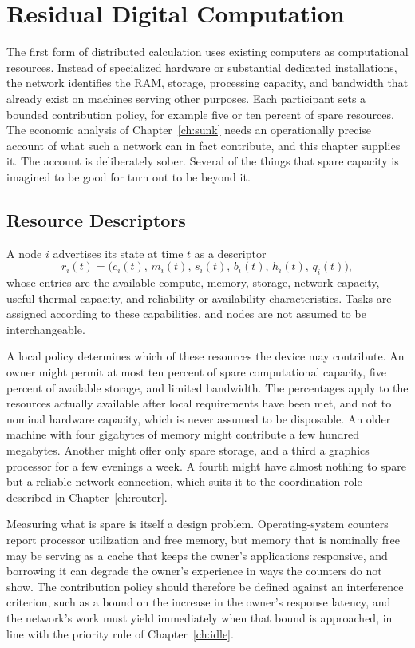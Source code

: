 \chapter{Residual Digital Computation}
\label{ch:residual}

The first form of distributed calculation uses existing computers as computational resources. Instead of specialized hardware or substantial dedicated installations, the network identifies the RAM, storage, processing capacity, and bandwidth that already exist on machines serving other purposes. Each participant sets a bounded contribution policy, for example five or ten percent of spare resources. The economic analysis of Chapter~\ref{ch:sunk} needs an operationally precise account of what such a network can in fact contribute, and this chapter supplies it. The account is deliberately sober. Several of the things that spare capacity is imagined to be good for turn out to be beyond it.

\section{Resource Descriptors}

A node $i$ advertises its state at time $t$ as a descriptor
\[
r_i(t)=\bigl(c_i(t),\,m_i(t),\,s_i(t),\,b_i(t),\,h_i(t),\,q_i(t)\bigr),
\]
whose entries are the available compute, memory, storage, network capacity, useful thermal capacity, and reliability or availability characteristics. Tasks are assigned according to these capabilities, and nodes are not assumed to be interchangeable.

A local policy determines which of these resources the device may contribute. An owner might permit at most ten percent of spare computational capacity, five percent of available storage, and limited bandwidth. The percentages apply to the resources actually available after local requirements have been met, and not to nominal hardware capacity, which is never assumed to be disposable. An older machine with four gigabytes of memory might contribute a few hundred megabytes. Another might offer only spare storage, and a third a graphics processor for a few evenings a week. A fourth might have almost nothing to spare but a reliable network connection, which suits it to the coordination role described in Chapter~\ref{ch:router}.

Measuring what is spare is itself a design problem. Operating-system counters report processor utilization and free memory, but memory that is nominally free may be serving as a cache that keeps the owner's applications responsive, and borrowing it can degrade the owner's experience in ways the counters do not show. The contribution policy should therefore be defined against an interference criterion, such as a bound on the increase in the owner's response latency, and the network's work must yield immediately when that bound is approached, in line with the priority rule of Chapter~\ref{ch:idle}.

